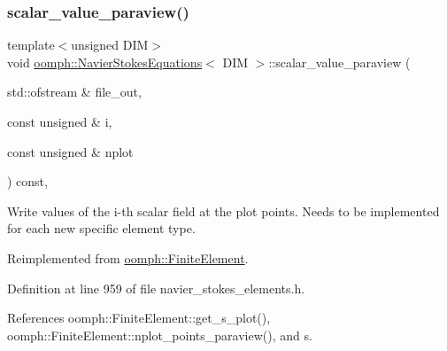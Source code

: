 \subsubsection{\texorpdfstring{scalar\+\_\+value\+\_\+paraview()}{scalar\_value\_paraview()}}
{\footnotesize\ttfamily template$<$unsigned D\+IM$>$ \\
void \hyperlink{classoomph_1_1NavierStokesEquations}{oomph\+::\+Navier\+Stokes\+Equations}$<$ D\+IM $>$\+::scalar\+\_\+value\+\_\+paraview (\begin{DoxyParamCaption}\item[{std\+::ofstream \&}]{file\+\_\+out,  }\item[{const unsigned \&}]{i,  }\item[{const unsigned \&}]{nplot }\end{DoxyParamCaption}) const\hspace{0.3cm}{\ttfamily [inline]}, {\ttfamily [virtual]}}



Write values of the i-\/th scalar field at the plot points. Needs to be implemented for each new specific element type. 



Reimplemented from \hyperlink{classoomph_1_1FiniteElement_a02cf8832a5e2886f1572bd36f7a7c1e3}{oomph\+::\+Finite\+Element}.



Definition at line 959 of file navier\+\_\+stokes\+\_\+elements.\+h.



References oomph\+::\+Finite\+Element\+::get\+\_\+s\+\_\+plot(), oomph\+::\+Finite\+Element\+::nplot\+\_\+points\+\_\+paraview(), and s.

\mbox{\label{classoomph_1_1NavierStokesEquations_a72e10915163058537f96563450734104}} 
